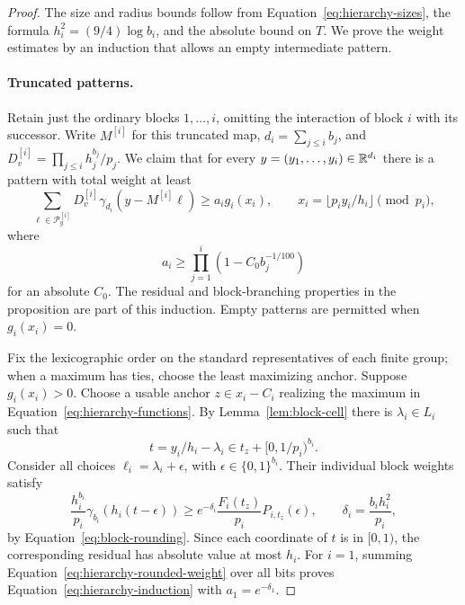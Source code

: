 \begin{proof}
The size and radius bounds follow from Equation~\eqref{eq:hierarchy-sizes},
the formula $h_i^2=(9/4)\log b_i$, and the absolute bound on $T$.  We prove
the weight estimates by an induction that allows an empty intermediate
pattern.

\paragraph{Truncated patterns.}
Retain just the ordinary blocks $1,\ldots,i$, omitting the interaction of
block $i$ with its successor.  Write $M^{[i]}$ for this truncated map,
$d_i=\sum_{j\le i}b_j$, and
$D_v^{[i]}=\prod_{j\le i}h_j^{b_j}/p_j$.  We claim that for every
$y=(y_1,\ldots,y_i)\in\mathbb R^{d_i}$ there is a pattern with total weight at
least
\begin{equation}
 \sum_{\ell\in\mathcal P^{[i]}_y}
      D_v^{[i]}\gamma_{d_i}(y-M^{[i]}\ell)
 \ge a_i g_i(x_i),\qquad
 x_i=\lfloor p_i y_i/h_i\rfloor\pmod {p_i},
 \label{eq:hierarchy-induction}
\end{equation}
where
\begin{equation}
 a_i\ge\prod_{j=1}^i(1-C_0 b_j^{-1/100})
 \label{eq:hierarchy-product}
\end{equation}
for an absolute $C_0$.  The residual and block-branching properties in the
proposition are part of this induction.  Empty patterns are permitted when
$g_i(x_i)=0$.

Fix the lexicographic order on the standard representatives of each
finite group; when a maximum has ties, choose the least maximizing anchor.
Suppose $g_i(x_i)>0$.  Choose a usable anchor $z\in x_i-C_i$ realizing
the maximum in Equation~\eqref{eq:hierarchy-functions}.  By
Lemma~\ref{lem:block-cell} there is $\lambda_i\in L_i$ such that
\[
 t=y_i/h_i-\lambda_i\in t_z+[0,1/p_i)^{b_i}.
\]
Consider all choices $\ell_i=\lambda_i+\epsilon$, with
$\epsilon\in\{0,1\}^{b_i}$.  Their individual block weights satisfy
\begin{equation}
 \frac{h_i^{b_i}}{p_i}\gamma_{b_i}(h_i(t-\epsilon))
 \ge e^{-\delta_i}\frac{F_i(t_z)}{p_i}P_{i,t_z}(\epsilon),
 \qquad \delta_i=\frac{b_i h_i^2}{p_i},
 \label{eq:hierarchy-rounded-weight}
\end{equation}
by Equation~\eqref{eq:block-rounding}.  Since each coordinate of $t$ is in
$[0,1)$, the corresponding residual has absolute value at most $h_i$.
For $i=1$, summing Equation~\eqref{eq:hierarchy-rounded-weight} over all
bits proves Equation~\eqref{eq:hierarchy-induction} with $a_1=e^{-\delta_1}$.


\end{proof}
